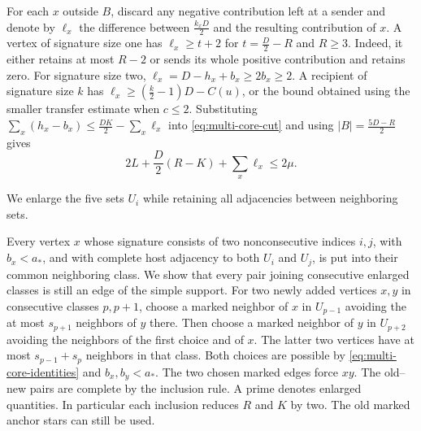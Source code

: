 For each $x$ outside $B$, discard any negative contribution left
at a sender and denote by $\ell_x$ the difference between
$\frac{k_xD}{2}$ and the resulting contribution of $x$.
A vertex of signature size one has $\ell_x\ge t+2$ for
$t=\frac{D}{2}-R$ and $R\ge3$. Indeed, it either retains at most
$R-2$ or sends its whole positive contribution and retains zero.
For signature size two, $\ell_x=D-h_x+b_x\ge2b_x\ge2$.
A recipient of signature size $k$ has
$\ell_x\ge(\frac{k}{2}-1)D-C(u)$, or the bound obtained using the
smaller transfer estimate when $c\le2$. Substituting
$\sum_x(h_x-b_x)\le\frac{DK}{2}-\sum_x\ell_x$ into
\eqref{eq:multi-core-cut} and using $|B|=\frac{5D-R}{2}$ gives
\begin{equation}\label{eq:multi-loss-budget}
 2L+\frac{D}{2}(R-K)+\sum_x\ell_x\le2\mu.
\end{equation}

We enlarge the five sets $U_i$ while retaining all adjacencies between neighboring sets.

Every vertex $x$ whose signature consists of two nonconsecutive indices $i,j$,
with $b_x<a_*$, and with complete host adjacency to both $U_i$ and
$U_j$, is put into their common neighboring class. We show that
every pair joining consecutive enlarged classes is still an edge
of the simple support. For two newly
added vertices $x,y$ in consecutive classes $p,p+1$, choose a marked
neighbor of $x$ in $U_{p-1}$ avoiding the at most $s_{p+1}$ neighbors
of $y$ there. Then choose a marked neighbor of $y$ in $U_{p+2}$ avoiding
the neighbors of the first choice and of $x$. The latter two vertices
have at most $s_{p-1}+s_p$ neighbors in that class. Both choices
are possible by \eqref{eq:multi-core-identities} and $b_x,b_y<a_*$.
The two chosen marked edges force $xy$. The old--new pairs are
complete by the inclusion rule. A prime denotes enlarged quantities.
In particular each inclusion reduces $R$ and $K$ by two. The old
marked anchor stars can still be used.

